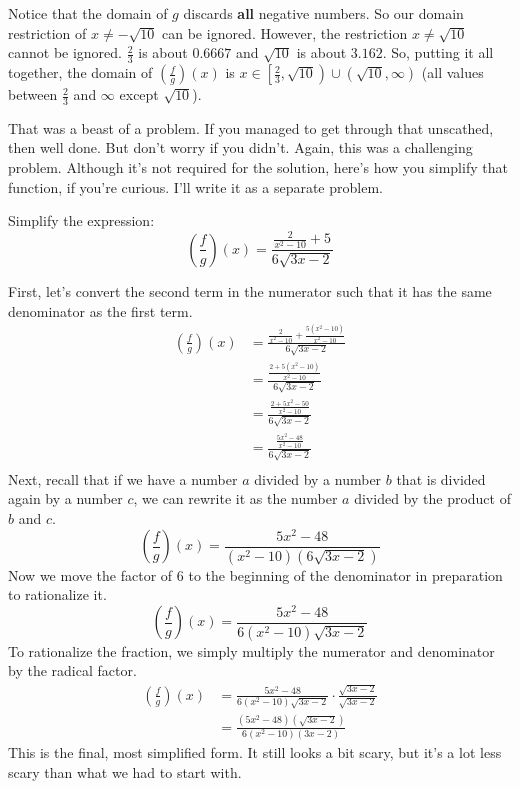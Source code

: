 \begin{solution}
    Notice that the domain of $g$ discards \textbf{all} negative numbers. So our domain restriction of $x \neq -\sqrt{10}$ can be ignored. However, the restriction $x \neq \sqrt{10}$ cannot be ignored. $\frac{2}{3}$ is about $0.6667$ and $\sqrt{10}$ is about $3.162$. So, putting it all together, the domain of $\left(\frac{f}{g} \right)(x)$ is $x \in \left[\frac{2}{3}, \sqrt{10} \right) \cup \left(\sqrt{10}, \infty\right)$ (all values between $\frac{2}{3}$ and $\infty$ except $\sqrt{10}$).
\end{solution}
That was a beast of a problem. If you managed to get through that unscathed, then well done. But don't worry if you didn't. Again, this was a challenging problem.
\clearpage
Although it's not required for the solution, here's how you simplify that function, if you're curious. I'll write it as a separate problem.
\begin{problem}
    Simplify the expression:
    \[
        \left(\frac{f}{g} \right)(x) = 
        \frac{\frac{2}{x^2 - 10} + 5}{6\sqrt{3x - 2}}
    \] 
\end{problem}
\begin{solution}
    First, let's convert the second term in the numerator such that it has the same denominator as the first term.
    \begin{align*}
        \left(\frac{f}{g} \right)(x) &= 
        \frac{\frac{2}{x^2 - 10} + \frac{5(x^2 - 10)}{x^2 - 10}}{6\sqrt{3x - 2}} \\
        &= \frac{\frac{2 + 5(x^2 - 10)}{x^2 - 10}}{6\sqrt{3x - 2}} \\
        &= \frac{\frac{2 + 5x^2 - 50}{x^2 - 10}}{6\sqrt{3x - 2}} \\
        &= \frac{\frac{5x^2 - 48}{x^2 - 10}}{6\sqrt{3x - 2}} \\
    \end{align*}
    Next, recall that if we have a number $a$ divided by a number $b$ that is divided again by a number $c$, we can rewrite it as the number $a$ divided by the product of $b$ and $c$.
    \[
    \left(\frac{f}{g} \right)(x) =
    \frac{5x^2 - 48}{(x^2 - 10)(6\sqrt{3x - 2})}
    \]
    Now we move the factor of $6$ to the beginning of the denominator in preparation to rationalize it.
    \[
    \left(\frac{f}{g} \right)(x) =
    \frac{5x^2 - 48}{6(x^2 - 10)\sqrt{3x - 2}}
    \]\clearpage
    To rationalize the fraction, we simply multiply the numerator and denominator by the radical factor.
    \begin{align*}
    \left(\frac{f}{g} \right)(x) &=
    \frac{5x^2 - 48}{6(x^2 - 10)\sqrt{3x - 2}} 
    \cdot \frac{\sqrt{3x - 2}}{\sqrt{3x - 2}} \\
    &= \frac{(5x^2 - 48)(\sqrt{3x - 2})}{6(x^2 - 10)(3x - 2)} 
    \end{align*}
    This is the final, most simplified form. It still looks a bit scary, but it's a lot less scary than what we had to start with.
\end{solution}